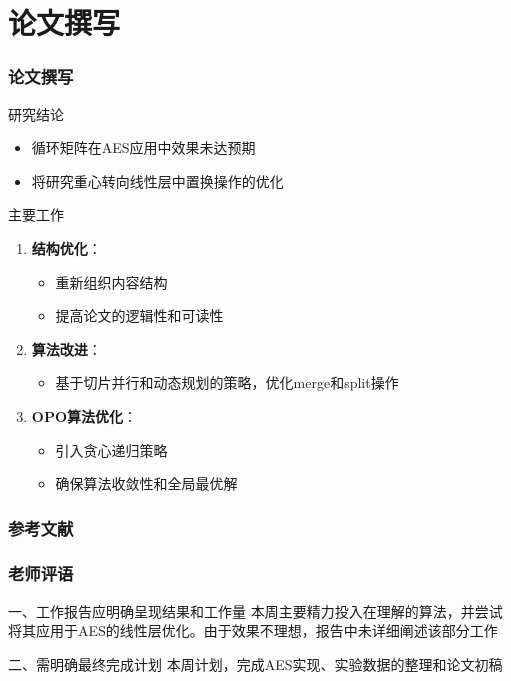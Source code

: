 \documentclass{beamer}
\begin{document}
\section{论文撰写}
\begin{frame}
    \frametitle{论文撰写}
    \begin{block}{研究结论}
        \begin{itemize}
            \item 循环矩阵在AES应用中效果未达预期
            \item 将研究重心转向线性层中置换操作的优化
        \end{itemize}
    \end{block}
    \begin{block}{主要工作}
        \begin{enumerate}
            \item \textbf{结构优化}：
            \begin{itemize}
                \item 重新组织内容结构
                \item 提高论文的逻辑性和可读性
            \end{itemize}
            \item \textbf{算法改进}：
            \begin{itemize}
                \item 基于切片并行和动态规划的策略，优化merge和split操作
            \end{itemize}
            \item \textbf{OPO算法优化}：
            \begin{itemize}
                \item 引入贪心递归策略
                \item 确保算法收敛性和全局最优解
            \end{itemize}
        \end{enumerate}
    \end{block}
\end{frame}

\begin{frame}[allowframebreaks]
    \frametitle{参考文献}
    
\end{frame}


\begin{frame}
    \frametitle{老师评语}
    \begin{block}{一、工作报告应明确呈现结果和工作量}
        本周主要精力投入在理解\cite{Leurent2024}的算法，并尝试将其应用于AES的线性层优化。由于效果不理想，报告中未详细阐述该部分工作
    \end{block}
    \begin{block}{二、需明确最终完成计划}
        本周计划，完成AES实现、实验数据的整理和论文初稿
    \end{block}
\end{frame}
\end{document}

